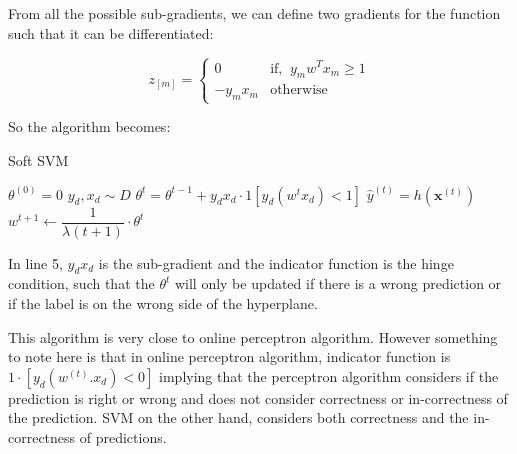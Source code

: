 \documentclass[11pt]{article}
\begin{document}
From all the possible sub-gradients, we can define two gradients for the function such that it can be differentiated:

\begin{equation}
    z_{[m]} = 
    \begin{cases}
    0 & \text{if, }\ y_m w^T x_m \geq 1\\
    -y_{m}x_{m} & \text{otherwise} 
    \end{cases}
\end{equation}

So the algorithm becomes:


\begin{algorithm}[H]
\caption{Soft SVM}
\label{algo:SoftSVM}
\begin{algorithmic}[1]
\STATE $\theta^{(0)}=0$ \hfill
{}
\STATE $y_d,x_d \sim  D$ \hfill 
\STATE $\theta^{t}=\theta^{t-1}+ y_{d}x_{d} \cdot 1[y_d(w^{t}x_{d})<1]$ \hfill 
\STATE $\hat{y}^{(t)} = h(\textbf{x}^{(t)})$ \hfill 
\STATE $w^{t+1} \leftarrow \dfrac{1}{\lambda(t+1)} \cdot \theta^{t}$ \hfill
\ENDFOR
\end{algorithmic}
\end{algorithm}

In line 5, $y_{d}x_{d}$ is the sub-gradient and the indicator function is the hinge condition, such that the $\theta^{t}$ will only be updated if there is a wrong prediction or if the label is on the wrong side of the hyperplane.

This algorithm is very close to online perceptron algorithm. However something to note here is that in online perceptron algorithm, indicator function is $1\cdot[y_d(w^(t).x_d)<0]$ implying that the perceptron algorithm considers if the prediction is right or wrong and does not consider correctness or in-correctness of the prediction. SVM on the other hand, considers both correctness and the in-correctness of predictions.
\end{document}
